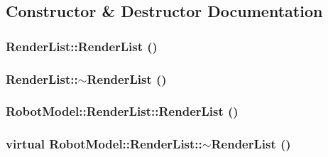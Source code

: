 \subsection{Constructor \& Destructor Documentation}
\hypertarget{class_robot_model_1_1_render_list_a98651fa6cd408cce14d6d245cd95fde4}{
\subsubsection[{RenderList}]{\setlength{\rightskip}{0pt plus 5cm}RenderList::RenderList ()}}
\label{class_robot_model_1_1_render_list_a98651fa6cd408cce14d6d245cd95fde4}
\hypertarget{class_robot_model_1_1_render_list_ae66a9f72d814771e42d7e50946053ef7}{
\subsubsection[{$\sim$RenderList}]{\setlength{\rightskip}{0pt plus 5cm}RenderList::$\sim$RenderList ()}}
\label{class_robot_model_1_1_render_list_ae66a9f72d814771e42d7e50946053ef7}
\hypertarget{class_robot_model_1_1_render_list_adf7ac2a28169e82bc8de6436aa16b521}{
\subsubsection[{RenderList}]{\setlength{\rightskip}{0pt plus 5cm}RobotModel::RenderList::RenderList ()}}
\label{class_robot_model_1_1_render_list_adf7ac2a28169e82bc8de6436aa16b521}
\hypertarget{class_robot_model_1_1_render_list_aed38c9aad54e5869e4ee48e2cdf4c89b}{
\subsubsection[{$\sim$RenderList}]{\setlength{\rightskip}{0pt plus 5cm}virtual RobotModel::RenderList::$\sim$RenderList ()}}
\label{class_robot_model_1_1_render_list_aed38c9aad54e5869e4ee48e2cdf4c89b}


